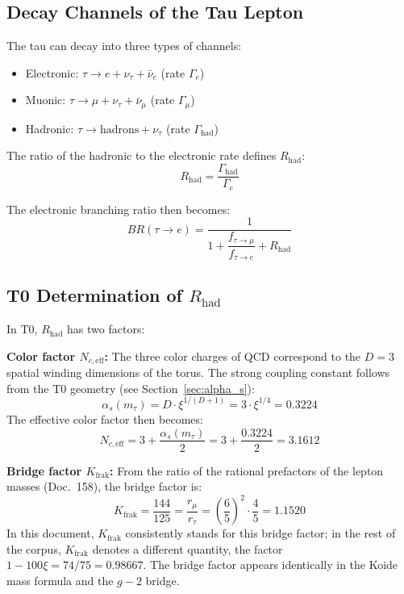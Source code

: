 	\subsection{Decay Channels of the Tau Lepton}
	
	The tau can decay into three types of channels:
	\begin{itemize}
		\item Electronic: $\tau \to e + \nu_\tau + \bar\nu_e$ (rate $\Gamma_e$)
		\item Muonic: $\tau \to \mu + \nu_\tau + \bar\nu_\mu$ (rate $\Gamma_\mu$)
		\item Hadronic: $\tau \to \text{hadrons} + \nu_\tau$ (rate $\Gamma_\text{had}$)
	\end{itemize}
	
	The ratio of the hadronic to the electronic rate defines $R_\text{had}$:
	\begin{equation}
		R_\text{had} = \frac{\Gamma_\text{had}}{\Gamma_e}
	\end{equation}
	
	The electronic branching ratio then becomes:
	\begin{equation}
		BR(\tau \to e) = \frac{1}{1 + \dfrac{f_{\tau \to \mu}}{f_{\tau \to e}} + R_\text{had}}
		\label{eq:br}
	\end{equation}
	
	\subsection{T0 Determination of $R_\text{had}$}
	
	In T0, $R_\text{had}$ has two factors:
	
	\textbf{Color factor $N_{c,\text{eff}}$:} The three color charges of QCD correspond to the $D = 3$ spatial winding dimensions of the torus. The strong coupling constant follows from the T0 geometry (see Section~\ref{sec:alpha_s}):
	\begin{equation}
		\alpha_s(m_\tau) = D \cdot \xi^{1/(D+1)} = 3 \cdot \xi^{1/4} = 0.3224
	\end{equation}
	The effective color factor then becomes:
	\begin{equation}
		N_{c,\text{eff}} = 3 + \frac{\alpha_s(m_\tau)}{2} = 3 + \frac{0.3224}{2} = 3.1612
	\end{equation}
	
	\textbf{Bridge factor $K_\text{frak}$:} From the ratio of the rational prefactors of the lepton masses (Doc.~158), the bridge factor is:
	\begin{equation}
		K_\text{frak} = \frac{144}{125} = \frac{r_\mu}{r_\tau} = \left(\frac{6}{5}\right)^2 \cdot \frac{4}{5} = 1.1520
	\end{equation}
	In this document, $K_\text{frak}$ consistently stands for this bridge factor; in the rest of the corpus, $K_\text{frak}$ denotes a different quantity, the factor $1 - 100\xi = 74/75 = 0.98667$. The bridge factor appears identically in the Koide mass formula and the $g-2$ bridge.
	
